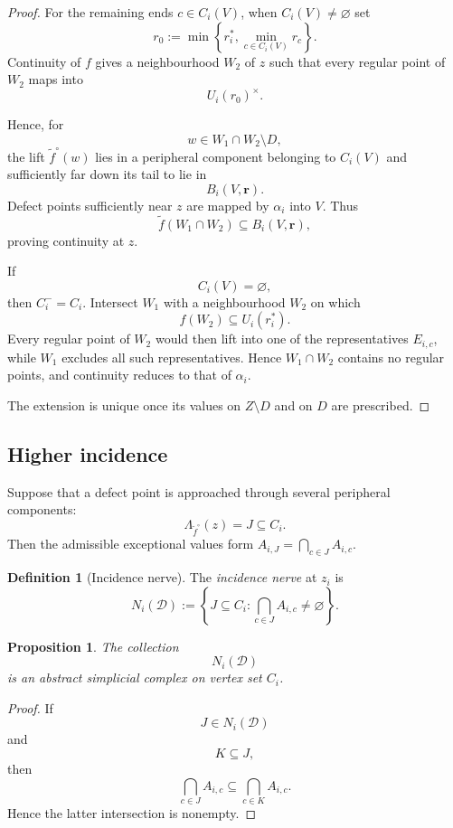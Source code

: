 \documentclass[11pt]{article}
\theoremstyle{plain}
\newtheorem{proposition}[theorem]{Proposition}
\theoremstyle{definition}
\newtheorem{definition}[theorem]{Definition}
\begin{document}
\begin{proof}
For the remaining ends $c\in C_i(V)$, when $C_i(V)\neq\varnothing$ set
\[
r_0:=\min\left\{r_i^*,\min_{c\in C_i(V)}r_c\right\}.
\]
Continuity of $f$ gives a neighbourhood $W_2$ of $z$ such that every
regular point of $W_2$ maps into
\[
U_i(r_0)^\times.
\]

Hence, for
\[
w\in
W_1\cap W_2\setminus D,
\]
the lift $\widetilde f^\circ(w)$ lies in a peripheral component belonging
to $C_i(V)$ and sufficiently far down its tail to lie in
\[
B_i(V,\mathbf r).
\]
Defect points sufficiently near $z$ are mapped by $\alpha_i$ into $V$.
Thus
\[
\widetilde f(W_1\cap W_2)
\subseteq
B_i(V,\mathbf r),
\]
proving continuity at $z$.

If
\[
C_i(V)=\varnothing,
\]
then $C_i^-=C_i$.  Intersect $W_1$ with a neighbourhood $W_2$ on which
\[
f(W_2)\subseteq U_i(r_i^*).
\]
Every regular point of $W_2$ would then lift into one of the representatives
$E_{i,c}$, while $W_1$ excludes all such representatives.  Hence
$W_1\cap W_2$ contains no regular points, and continuity reduces to that of
$\alpha_i$.

The extension is unique once its values on $Z\setminus D$ and on $D$ are
prescribed.
\end{proof}


\subsection{Higher incidence}
\label{subsec:higher-incidence-lifting}

Suppose that a defect point is approached through several peripheral
components:
\[
\Lambda_{\widetilde f^\circ}(z)=J
\subseteq C_i.
\]
Then the admissible exceptional values form $A_{i,J}=\bigcap_{c\in J}A_{i,c}$.

\begin{definition}[Incidence nerve]
\label{def:incidence-nerve}
The \emph{incidence nerve} at $z_i$ is
\[
N_i(\mathcal D)
:=
\left\{
J\subseteq C_i:
\bigcap_{c\in J}A_{i,c}\neq\varnothing
\right\}.
\]
\end{definition}

\begin{proposition}
\label{prop:incidence-nerve-complex}
The collection
\[
N_i(\mathcal D)
\]
is an abstract simplicial complex on vertex set $C_i$.
\end{proposition}

\begin{proof}
If
\[
J\in N_i(\mathcal D)
\]
and
\[
K\subseteq J,
\]
then
\[
\bigcap_{c\in J}A_{i,c}
\subseteq
\bigcap_{c\in K}A_{i,c}.
\]
Hence the latter intersection is nonempty.
\end{proof}
\end{document}
